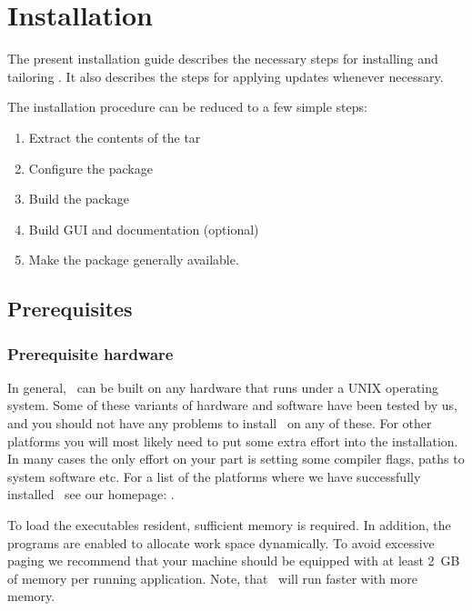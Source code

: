 
\chapter{Installation}

The present installation guide describes the necessary steps for installing
and tailoring \molcas. It also describes the steps for applying updates
whenever necessary.

The installation procedure can be reduced to a few simple steps:
\begin{enumerate}
\item Extract the contents of the tar
\item Configure the package
\item Build the package
\item Build GUI and documentation (optional)
\item Make the package generally available.
\end{enumerate}

\section{Prerequisites}
\subsection{Prerequisite hardware}

In general, \molcas\ can be built on any hardware that runs under a UNIX operating system.
Some of these variants of hardware and software have been tested by us, and you
should not have any problems to install \molcas\ on any of these.
For other platforms you will most likely need to put some extra effort into the installation.
In many cases the only effort on your part is setting some compiler flags,
paths to system software etc.
For a list of the platforms where we have
successfully installed \molcas\ see our homepage:
\MolcasWWW.

To load the executables resident, sufficient memory is required.
In addition, the programs are enabled to allocate work space dynamically.
To avoid excessive paging we recommend that your machine should be
equipped with at least 2~GB of memory per running application. Note, that
\molcas\ will run faster with more memory.

